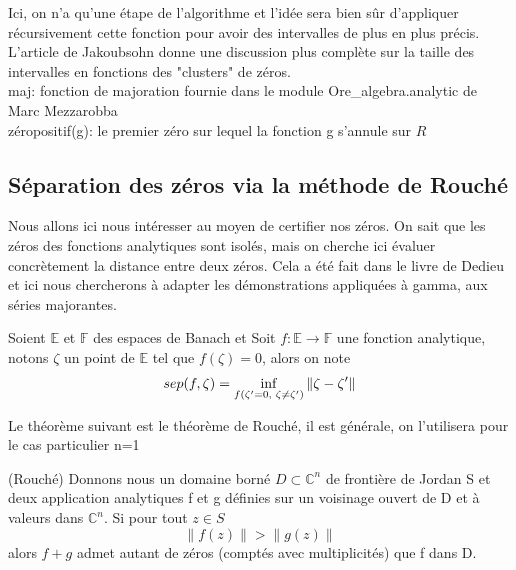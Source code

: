 \documentclass[a4paper,10.5pt]{article}
\begin{document}
	\noindent Ici, on n'a qu'une étape de l'algorithme et l'idée sera bien sûr d'appliquer récursivement cette fonction pour avoir des intervalles de plus en plus précis. L'article de Jakoubsohn donne une discussion plus complète sur la taille des intervalles en fonctions des "clusters" de zéros.\\
	\noindent maj: fonction de majoration fournie dans le module Ore\_algebra.analytic de Marc Mezzarobba\\
	zéropositif(g): le premier zéro sur lequel la fonction g s'annule sur ${R}$
	\\
	
	\begin{definition}
		
	\end{definition}
	
	
	\subsection{Séparation des zéros via la méthode de Rouché}
	Nous allons ici nous intéresser au moyen de certifier nos zéros. On sait que les zéros des fonctions analytiques sont isolés, mais on cherche ici évaluer concrètement la distance entre deux zéros. Cela a été fait dans le livre de Dedieu et ici nous chercherons à adapter les démonstrations appliquées à gamma, aux séries majorantes.
	
	\begin{definition} Soient $\mathbb{E}$ et $\mathbb{F}$ des espaces de Banach et 
		Soit $f:\mathbb{E}\rightarrow \mathbb{F}$ une fonction analytique, notons $\zeta$ un point de $\mathbb{E}$ tel que $f(\zeta)=0$, alors on note
		\[sep(f,\zeta)=\inf_{f(\zeta '=0, \hspace{1mm} \zeta \neq \zeta ')}\left\|\zeta-\zeta '\right\|\] 
	\end{definition}
	
	Le théorème suivant est le théorème de Rouché, il est générale, on l'utilisera pour le cas particulier n=1

	\begin{theorem}(Rouché) Donnons nous un domaine borné $D \subset \mathbb{C}^{n}$ de frontière de Jordan S et deux application analytiques f et g définies sur un voisinage ouvert de D et à valeurs dans $\mathbb{C}^n$. Si pour tout $z \in S$ 
		\[\left\|f(z)\right\|>\left\|g(z)\right\|\]
	alors $f+g$ admet autant de zéros (comptés avec multiplicités) que f dans D.
	\end{theorem}
	
\end{document}
